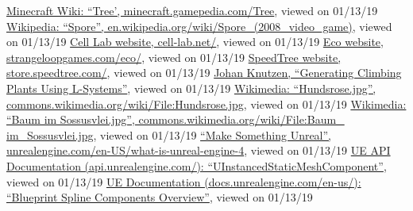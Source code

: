\documentclass[11pt, abstract=on]{scrartcl}
\begin{document}
\begin{thebibliography}{99}
	  \href{https://minecraft.gamepedia.com/Tree}{Minecraft Wiki: ``Tree', minecraft.gamepedia.com/Tree}, viewed on 01/13/19
	  \href{https://en.wikipedia.org/wiki/Spore_(2008_video_game)}{Wikipedia: ``Spore'', en.wikipedia.org/wiki/Spore\_(2008\_video\_game)}, viewed on 01/13/19
	  \href{http://cell-lab.net/}{Cell Lab website, cell-lab.net/}, viewed on 01/13/19
	  \href{https://www.strangeloopgames.com/eco/}{Eco website, strangeloopgames.com/eco/}, viewed on 01/13/19
	  \href{https://store.speedtree.com/}{SpeedTree website, store.speedtree.com/}, viewed on 01/13/19
	  \href{http://www.cse.chalmers.se/~uffe/xjobb/climbingplants.pdf}{Johan Knutzen, ``Generating Climbing Plants Using L-Systems''}, viewed on 01/13/19
	  \href{https://commons.wikimedia.org/wiki/File:Hundsrose.jpg}{Wikimedia: ``Hundsrose.jpg'', commons.wikimedia.org/wiki/File:Hundsrose.jpg}, viewed on 01/13/19
	 \href{https://commons.wikimedia.org/wiki/File:Baum_im_Sossusvlei.jpg}
	{Wikimedia: ``Baum im Sossusvlei.jpg'', commons.wikimedia.org/wiki/File:Baum\_ im\_Sossusvlei.jpg}, viewed on 01/13/19
	  \href{https://www.unrealengine.com/en-US/what-is-unreal-engine-4}{``Make Something Unreal'', unrealengine.com/en-US/what-is-unreal-engine-4}, viewed on 01/13/19
	  \href{https://api.unrealengine.com/INT/API/Runtime/Engine/Components/UInstancedStaticMeshComponent/index.html}{UE API Documentation (api.unrealengine.com/): ``UInstancedStaticMeshComponent''}, viewed on 01/13/19
	  \href{https://docs.unrealengine.com/en-us/Engine/BlueprintSplines/Overview}{UE Documentation (docs.unrealengine.com/en-us/): ``Blueprint Spline Components Overview''}, viewed on 01/13/19
	
\end{thebibliography}
\end{document}
